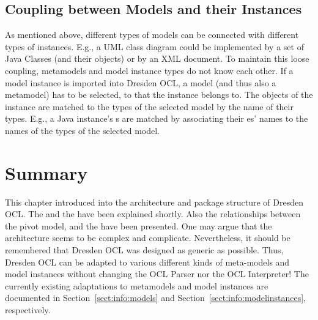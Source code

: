 \subsection{Coupling between Models and their Instances}

As mentioned above, different types of models can be connected with different 
types of instances. E.g., a \acs{UML} class diagram could be implemented by a 
set of Java Classes (and their objects) or by an \acs{XML} document. To 
maintain this loose coupling, metamodels and model instance types do not 
know each other. If a model instance is imported into Dresden OCL, a model (and
thus also a metamodel) has to be selected, to that the instance belongs to. The
objects of the instance are matched to the types of the selected model by the 
name of their types. E.g., a Java instance's s are matched by
associating their es' names to the names of the types of the
selected model.



\section{Summary}

This chapter introduced into the architecture and package structure of
Dresden OCL. The  and the  
have been explained shortly. Also the relationships between the pivot model, 
 and the  have
been presented. One may argue that the architecture seems to be complex and 
complicate. Nevertheless, it should be remembered that Dresden OCL was 
designed as generic as possible. Thus, Dresden OCL can be adapted to various
different kinds of meta-models and model instances without changing the
\acs{OCL} Parser nor the \acs{OCL} Interpreter! The currently existing
adaptations to metamodels and model instances are documented in
Section~\ref{sect:info:models} and Section~\ref{sect:info:modelinstances},
respectively.
